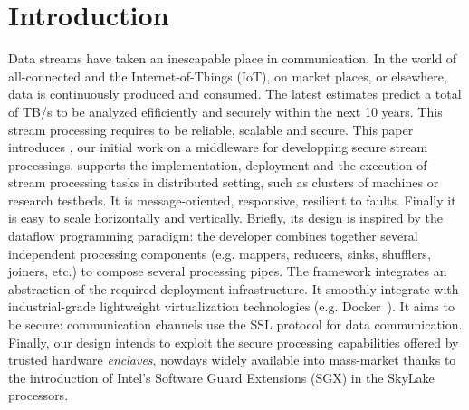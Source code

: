 \section{Introduction}
\label{sec:introduction}


Data streams have taken an inescapable place in communication.
In the world of all-connected and the Internet-of-Things (IoT), on market places, or elsewhere, data is continuously produced and consumed.
The latest estimates predict a total of  TB/s to be analyzed efificiently and securely within the next 10 years.
This stream processing requires to be reliable, scalable and secure.
This paper introduces \SYS, our initial work on a middleware for developping secure stream processings.
\SYS supports the implementation, deployment and the execution of stream processing tasks in distributed setting, such as clusters of machines or research testbeds.
It is message-oriented, responsive, resilient to faults.
Finally it is easy to scale horizontally and vertically.
Briefly, its design is inspired by the dataflow programming paradigm: the developer combines together several independent processing components (e.g. mappers, reducers, sinks, shufflers, joiners, etc.) to compose several processing pipes.%
The framework integrates an abstraction of the required deployment infrastructure.
It smoothly integrate with industrial-grade lightweight virtualization technologies (e.g. Docker~\cite{}).%
It aims to be secure: communication channels use the SSL protocol for data communication.
Finally, our design intends to exploit the secure processing capabilities offered by trusted hardware \emph{enclaves}, nowdays widely available into mass-market thanks to the introduction of Intel's Software Guard Extensions (SGX)\cite{costan_intel} in the SkyLake processors.

